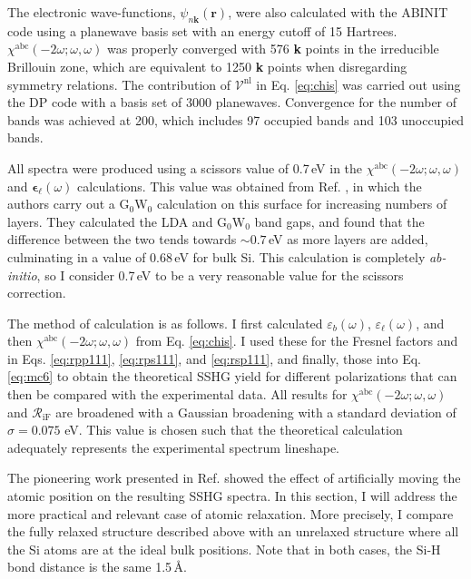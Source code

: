 The electronic wave-functions, $\psi_{n\mathbf{k}}(\mathbf{r})$, were also
calculated with the ABINIT code using a planewave basis set with an energy
cutoff of 15 Hartrees. $\chi^{\mathrm{abc}}(-2\omega;\omega,\omega)$ was
properly converged with 576 \textbf{k} points in the irreducible Brillouin zone,
which are equivalent to 1250 \textbf{k} points when disregarding symmetry
relations. The contribution of $\boldsymbol{\mathcal{V}}^\mathrm{nl}$ in Eq.
\eqref{eq:chis} was carried out using the DP\cite{olevanoDP} code with a basis
set of 3000 planewaves. Convergence for the number of bands was achieved at 200,
which includes 97 occupied bands and 103 unoccupied bands.

All spectra were produced using a scissors value of 0.7\,eV in the
$\chi^{\mathrm{abc}}(-2\omega;\omega,\omega)$ and
$\boldsymbol{\epsilon}_{\ell}(\omega)$ calculations. This value was obtained
from Ref. \cite{liPRB10}, in which the authors carry out a
$\mathrm{G}_{0}\mathrm{W}_{0}$ calculation on this surface for increasing
numbers of layers. They calculated the LDA and $\mathrm{G}_{0}\mathrm{W}_{0}$
band gaps, and found that the difference between the two tends towards
$\sim0.7$\,eV as more layers are added, culminating in a value of 0.68\,eV for
bulk Si. This calculation is completely \emph{ab-initio}, so I consider 0.7\,eV
to be a very reasonable value for the scissors correction.

The method of calculation is as follows. I first calculated
$\varepsilon_{b}(\omega)$, $\varepsilon_{\ell}(\omega)$, and then
$\chi^{\mathrm{abc}}(-2\omega;\omega,\omega)$ from Eq. \eqref{eq:chis}. I used
these for the Fresnel factors and in Eqs. \eqref{eq:rpp111}, \eqref{eq:rps111},
and \eqref{eq:rsp111}, and finally, those into Eq. \eqref{eq:mc6} to obtain the
theoretical SSHG yield for different polarizations that can then be compared
with the experimental data. All results for
$\chi^{\mathrm{abc}}(-2\omega;\omega,\omega)$ and ${\mathcal R_{\mathrm{iF}}}$
are broadened with a Gaussian broadening with a standard deviation of
$\sigma=0.075$ eV. This value is chosen such that the theoretical calculation
adequately represents the experimental spectrum lineshape.

The pioneering work presented in Ref. \cite{mejiaPRB02} showed the effect of
artificially moving the atomic position on the resulting SSHG spectra. In this
section, I will address the more practical and relevant case of atomic
relaxation. More precisely, I compare the fully relaxed structure described
above with an unrelaxed structure where all the Si atoms are at the ideal bulk
positions. Note that in both cases, the Si-H bond distance is the same 1.5\,\AA.

